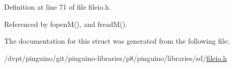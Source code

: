 Definition at line 71 of file fileio.\-h.



Referenced by fopen\-M(), and fread\-M().



The documentation for this struct was generated from the following file\-:\begin{DoxyCompactItemize}
\item 
/dvpt/pinguino/git/pinguino-\/libraries/p8/pinguino/libraries/sd/\hyperlink{p8_2pinguino_2libraries_2sd_2fileio_8h}{fileio.\-h}\end{DoxyCompactItemize}
